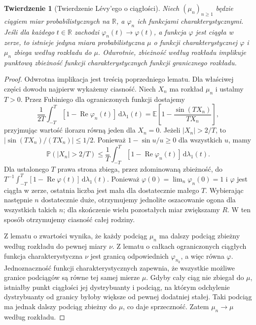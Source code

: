 \documentclass[11pt,a4paper,oneside]{report}
\numberwithin{equation}{chapter}
\theoremstyle{plain}
\newtheorem{twierdzenie}{Twierdzenie}[chapter]
\theoremstyle{definition}
\theoremstyle{remark}
\newcommand{\R}{\mathbb{R}}
\newcommand{\Prob}{\mathbb{P}}
\newcommand{\E}{\mathbb{E}}
\newcommand{\dd}{\mathrm{d}}
\begin{document}
\begin{twierdzenie}[Twierdzenie Lévy'ego o ciągłości]
Niech $(\mu_n)_{n\geq1}$ będzie ciągiem miar
probabilistycznych na $\R$, a $\varphi_n$ ich
funkcjami charakterystycznymi. Jeśli dla każdego
$t\in\R$ zachodzi $\varphi_n(t)\to\varphi(t)$,
a funkcja $\varphi$ jest ciągła w zerze, to istnieje
jedyna miara probabilistyczna $\mu$ o funkcji
charakterystycznej $\varphi$ i $\mu_n$ zbiega
według rozkładu do $\mu$.
Odwrotnie, zbieżność według rozkładu implikuje
punktową zbieżność funkcji charakterystycznych
funkcji granicznego rozkładu.
\end{twierdzenie}
\begin{proof}
Odwrotna implikacja jest treścią poprzedniego lematu.
Dla właściwej części dowodu najpierw wykażemy ciasność.
Niech $X_n$ ma rozkład $\mu_n$ i ustalmy $T>0$.
Przez Fubiniego dla ograniczonych funkcji dostajemy
\[
\frac1{2T}\int_{-T}^T[1-\operatorname{Re}\varphi_n(t)]
\,\dd\lambda_1(t)
=\E\left[1-\frac{\sin(TX_n)}{TX_n}\right],
\]
przyjmując wartość ilorazu równą jeden dla $X_n=0$.
Jeżeli $|X_n|>2/T$, to
$|\sin(TX_n)/(TX_n)|\leq1/2$.
Ponieważ $1-\sin u/u\geq0$ dla wszystkich $u$, mamy
\[
\Prob(|X_n|>2/T)\leq\frac1T
\int_{-T}^T[1-\operatorname{Re}\varphi_n(t)]
\,\dd\lambda_1(t).
\]
Dla ustalonego $T$ prawa strona zbiega, przez zdominowaną
zbieżność, do $T^{-1}\int_{-T}^T
[1-\operatorname{Re}\varphi(t)]\,\dd\lambda_1(t)$.
Ponieważ $\varphi(0)=\lim_n\varphi_n(0)=1$
i $\varphi$ jest ciągła w zerze, ostatnia liczba jest
mała dla dostatecznie małego $T$. Wybierając następnie
$n$ dostatecznie duże, otrzymujemy jednolite
oszacowanie ogona dla wszystkich takich $n$;
dla skończenie wielu pozostałych miar zwiększamy $R$.
W ten sposób otrzymujemy ciasność całej rodziny.

Z lematu o zwartości wynika, że każdy podciąg $\mu_n$
ma dalszy podciąg zbieżny według rozkładu do pewnej
miary $\nu$. Z lematu o całkach ograniczonych ciągłych
funkcja charakterystyczna $\nu$ jest granicą
odpowiednich $\varphi_{n_k}$, a więc równa $\varphi$.
Jednoznaczność funkcji charakterystycznych zapewnia,
że wszystkie możliwe granice podciągów są równe tej
samej mierze $\mu$. Gdyby cały ciąg nie zbiegał do
$\mu$, istniałby punkt ciągłości jej dystrybuanty
i podciąg, na którym odchylenie dystrybuanty od granicy
byłoby większe od pewnej dodatniej stałej. Taki podciąg
ma jednak dalszy podciąg zbieżny do $\mu$, co daje
sprzeczność. Zatem $\mu_n\to\mu$ według rozkładu.
\end{proof}
\end{document}
